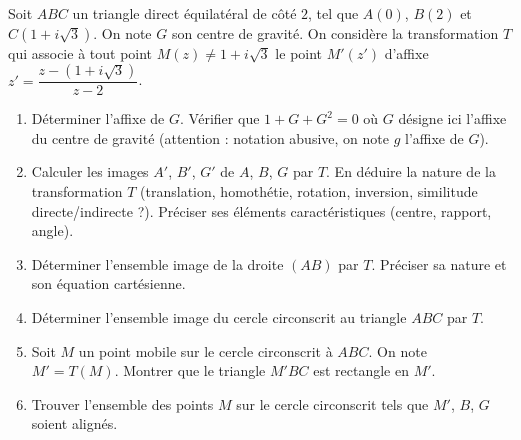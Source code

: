 \documentclass[11pt]{article}
\begin{document}
\begin{exercice}
Soit $ABC$ un triangle direct équilatéral de côté $2$, tel que $A(0)$, $B(2)$ et $C(1+i\sqrt{3})$. On note $G$ son centre de gravité. On considère la transformation $T$ qui associe à tout point $M(z) \neq 1+i\sqrt{3}$ le point $M'(z')$ d'affixe $z' = \dfrac{z - (1+i\sqrt{3})}{z - 2}$.
\begin{enumerate}
    \item Déterminer l'affixe de $G$. Vérifier que $1+G+G^2 = 0$ où $G$ désigne ici l'affixe du centre de gravité (attention : notation abusive, on note $g$ l'affixe de $G$).
    \item Calculer les images $A'$, $B'$, $G'$ de $A$, $B$, $G$ par $T$. En déduire la nature de la transformation $T$ (translation, homothétie, rotation, inversion, similitude directe/indirecte ?). Préciser ses éléments caractéristiques (centre, rapport, angle).
    \item Déterminer l'ensemble image de la droite $(AB)$ par $T$. Préciser sa nature et son équation cartésienne.
    \item Déterminer l'ensemble image du cercle circonscrit au triangle $ABC$ par $T$.
    \item Soit $M$ un point mobile sur le cercle circonscrit à $ABC$. On note $M' = T(M)$. Montrer que le triangle $M'BC$ est rectangle en $M'$.
    \item Trouver l'ensemble des points $M$ sur le cercle circonscrit tels que $M'$, $B$, $G$ soient alignés.
\end{enumerate}
\end{exercice}
\end{document}
